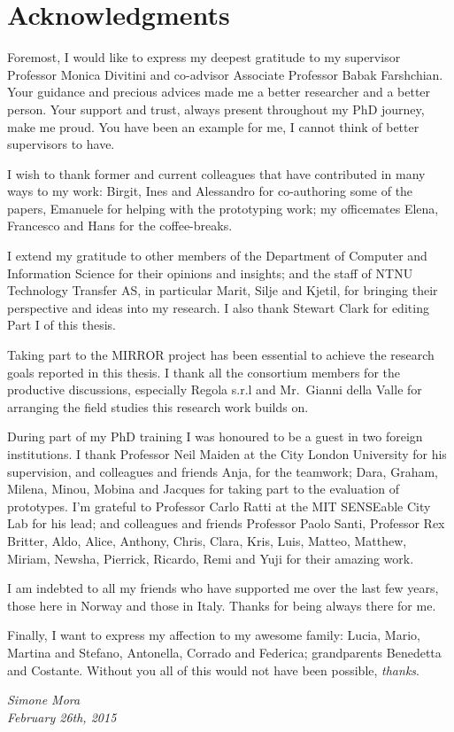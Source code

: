 \chapter{Acknowledgments}
\enlargethispage{\baselineskip}

Foremost, I would like to express my deepest gratitude to my supervisor Professor Monica Divitini and co-advisor Associate Professor Babak Farshchian. Your guidance and precious advices made me a better researcher and a better person. Your support and trust, always present throughout my PhD journey, make me proud. You have been an example for me, I cannot think of better supervisors to have.

I wish to thank former and current colleagues that have contributed in many ways to my work: Birgit, Ines and Alessandro for co-authoring some of the papers, Emanuele for helping with the prototyping work; my officemates Elena, Francesco and Hans for the coffee-breaks. 

I extend my gratitude to other members of the Department of Computer and Information Science for their opinions and insights; and the staff of NTNU Technology Transfer AS, in particular Marit, Silje and Kjetil, for bringing their perspective and ideas into my research. I also thank Stewart Clark for editing Part I of this thesis.

Taking part to the MIRROR project has been essential to achieve the research goals reported in this thesis. I thank all the consortium members for the productive discussions, especially Regola s.r.l and Mr.\ Gianni della Valle for arranging the field studies this research work builds on.

During part of my PhD training I was honoured to be a guest in two foreign institutions. I thank Professor Neil Maiden at the City London University for his supervision, and colleagues and friends Anja, for the teamwork; Dara, Graham, Milena, Minou, Mobina and Jacques for taking part to the evaluation of prototypes. I'm grateful to Professor Carlo Ratti at the MIT SENSEable City Lab for his lead; and colleagues and friends Professor Paolo Santi, Professor Rex Britter, Aldo, Alice, Anthony, Chris, Clara, Kris, Luis, Matteo, Matthew, Miriam, Newsha, Pierrick, Ricardo, Remi and Yuji for their amazing work.    

I am indebted to all my friends who have supported me over the last few years, those here in Norway and those in Italy. Thanks for being always there for me.

Finally, I want to express my affection to my awesome family: Lucia, Mario, Martina and Stefano, Antonella, Corrado and Federica; grandparents Benedetta and Costante. Without you all of this would not have been possible, \emph{thanks}.

\begin{flushright}
\emph{\small Simone Mora}\\\emph{\small February 26th, 2015}	
\end{flushright}


